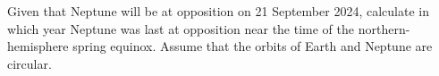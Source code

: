 Given that Neptune will be at opposition on 21 September 2024, calculate in
which year Neptune was last at opposition near the time of the
northern-hemisphere spring equinox. Assume that the orbits of Earth and Neptune
are circular.

